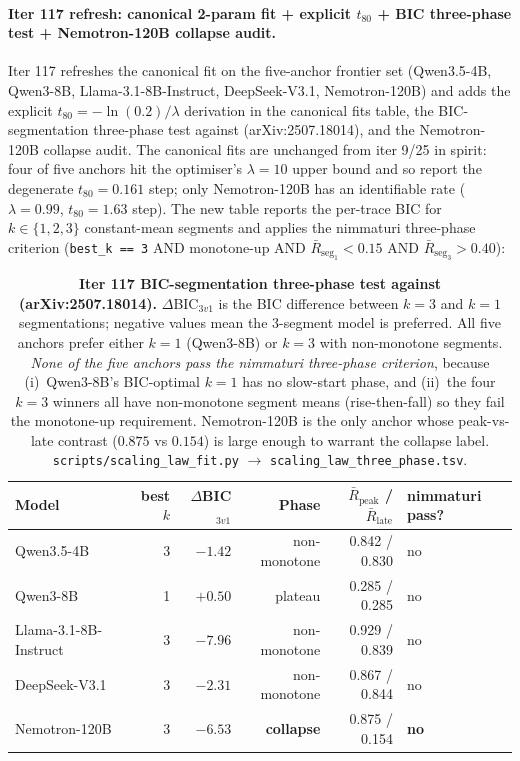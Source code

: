 \documentclass{article}
\begin{document}
\paragraph{Iter 117 refresh: canonical 2-param fit + explicit $t_{80}$ + BIC three-phase test + Nemotron-120B collapse audit.}
\label{par:scaling-iter117}
Iter 117 refreshes the canonical fit on the five-anchor frontier set
(Qwen3.5-4B, Qwen3-8B, Llama-3.1-8B-Instruct, DeepSeek-V3.1,
Nemotron-120B) and adds the explicit $t_{80}=-\ln(0.2)/\lambda$
derivation in the canonical fits table, the BIC-segmentation
three-phase test against \citet{nimmaturi2025predictive}
(arXiv:2507.18014), and the Nemotron-120B collapse audit.  The
canonical fits are unchanged from iter 9/25 in spirit: four of five
anchors hit the optimiser's $\lambda = 10$ upper bound and so report
the degenerate $t_{80} = 0.161$ step; only Nemotron-120B has an
identifiable rate ($\lambda = 0.99$, $t_{80} = 1.63$ step).  The new
table reports the per-trace BIC for $k \in \{1,2,3\}$ constant-mean
segments and applies the nimmaturi three-phase criterion
(\texttt{best\_k == 3} AND monotone-up AND
$\bar R_{\text{seg}_1} < 0.15$ AND $\bar R_{\text{seg}_3} > 0.40$):

\begin{table}[t]
  \centering
  \small
  \begin{tabular}{lrrrrl}
    \toprule
    Model & best $k$ & $\Delta$BIC$_{3v1}$ & Phase &
           $\bar R_{\text{peak}}$ / $\bar R_{\text{late}}$ &
           nimmaturi pass? \\
    \midrule
    Qwen3.5-4B             & 3 & $-1.42$ & non-monotone & 0.842 / 0.830 & no \\
    Qwen3-8B               & 1 & $+0.50$ & plateau       & 0.285 / 0.285 & no \\
    Llama-3.1-8B-Instruct  & 3 & $-7.96$ & non-monotone & 0.929 / 0.839 & no \\
    DeepSeek-V3.1          & 3 & $-2.31$ & non-monotone & 0.867 / 0.844 & no \\
    Nemotron-120B          & 3 & $-6.53$ & \textbf{collapse} & 0.875 / 0.154 & \textbf{no} \\
    \bottomrule
  \end{tabular}
  \caption{\textbf{Iter 117 BIC-segmentation three-phase test against
    \citet{nimmaturi2025predictive} (arXiv:2507.18014).}
    $\Delta$BIC$_{3v1}$ is the BIC difference between $k=3$ and
    $k=1$ segmentations; negative values mean the 3-segment model
    is preferred.  All five anchors prefer either $k=1$ (Qwen3-8B)
    or $k=3$ with non-monotone segments.  \emph{None of the five
    anchors pass the nimmaturi three-phase criterion}, because
    (i)~Qwen3-8B's BIC-optimal $k=1$ has no slow-start phase, and
    (ii)~the four $k=3$ winners all have non-monotone segment means
    (rise-then-fall) so they fail the monotone-up requirement.
    Nemotron-120B is the only anchor whose peak-vs-late contrast
    ($0.875$ vs $0.154$) is large enough to warrant the collapse
    label.  \texttt{scripts/scaling\_law\_fit.py} $\to$
    \texttt{scaling\_law\_three\_phase.tsv}.}
  \label{tab:scaling-iter117-bic}
\end{table}
\end{document}
